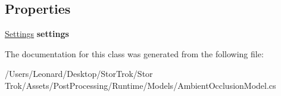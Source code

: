 \subsection*{Properties}
\begin{DoxyCompactItemize}
\item 
\mbox{\label{class_unity_engine_1_1_post_processing_1_1_ambient_occlusion_model_a6105dc68e0acd74c0b10137f664949b0}} 
\hyperlink{struct_unity_engine_1_1_post_processing_1_1_ambient_occlusion_model_1_1_settings}{Settings} {\bfseries settings}
\end{DoxyCompactItemize}


The documentation for this class was generated from the following file\+:\begin{DoxyCompactItemize}
\item 
/\+Users/\+Leonard/\+Desktop/\+Stor\+Trok/\+Stor Trok/\+Assets/\+Post\+Processing/\+Runtime/\+Models/Ambient\+Occlusion\+Model.\+cs\end{DoxyCompactItemize}
